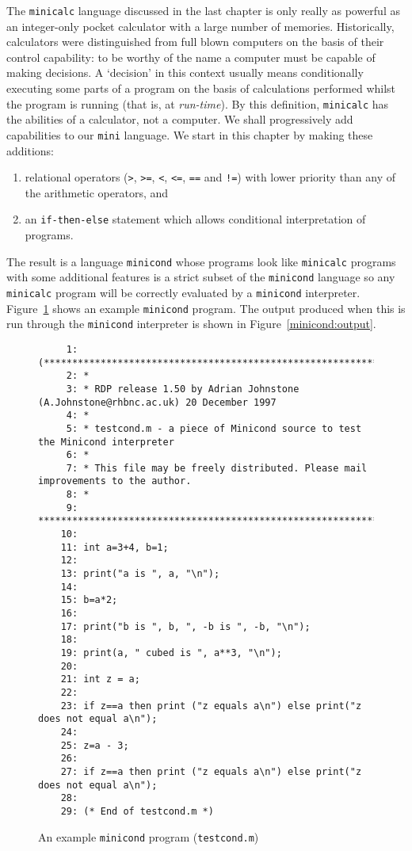 The {\tt minicalc} language discussed in the last chapter is only really
as powerful as an integer-only pocket calculator with a large number of
memories. Historically, calculators were distinguished from full blown
computers on the basis of their control capability: to be worthy of the
name a computer must be capable of making decisions. A `decision' in
this context usually means conditionally executing some parts of a
program on the basis of calculations performed whilst the program is
running (that is, at {\em run-time}). By this definition, {\tt minicalc}
has the abilities of a calculator, not a computer. We shall
progressively add capabilities to our {\tt mini} language. We start in this chapter
by making these additions:
\begin{enumerate}
\item relational operators (\verb+>+, \verb+>=+, \verb+<+, \verb+<=+, \verb+==+ and \verb+!=+)
with lower priority than any of the arithmetic operators, and
\item an {\tt if-then-else} statement which allows conditional interpretation of programs.
\end{enumerate}
The result is a language {\tt minicond} whose
programs look like {\tt minicalc} programs with some
additional features is a strict subset of the
{\tt minicond} language so any {\tt minicalc} program will be correctly
evaluated by a {\tt minicond} interpreter. Figure~\ref{minicond:program}
 shows an example {\tt minicond} program. The output produced when this
is run through the {\tt minicond} interpreter is shown in
Figure~\ref{minicond:output}.


\begin{figure}
\hspace*{-1cm}
\begin{minipage}{30cm}
\footnotesize
\begin{verbatim}
     1: (*******************************************************************************
     2: *
     3: * RDP release 1.50 by Adrian Johnstone (A.Johnstone@rhbnc.ac.uk) 20 December 1997
     4: *
     5: * testcond.m - a piece of Minicond source to test the Minicond interpreter
     6: *
     7: * This file may be freely distributed. Please mail improvements to the author.
     8: *
     9: *******************************************************************************)
    10: 
    11: int a=3+4, b=1;
    12: 
    13: print("a is ", a, "\n");
    14: 
    15: b=a*2;
    16: 
    17: print("b is ", b, ", -b is ", -b, "\n");
    18: 
    19: print(a, " cubed is ", a**3, "\n");
    20: 
    21: int z = a;
    22: 
    23: if z==a then print ("z equals a\n") else print("z does not equal a\n");
    24: 
    25: z=a - 3;
    26: 
    27: if z==a then print ("z equals a\n") else print("z does not equal a\n");
    28: 
    29: (* End of testcond.m *)
\end{verbatim}
\end{minipage}
\caption{An example {\tt minicond} program ({\tt testcond.m})}
\label{minicond:program}
\end{figure}

